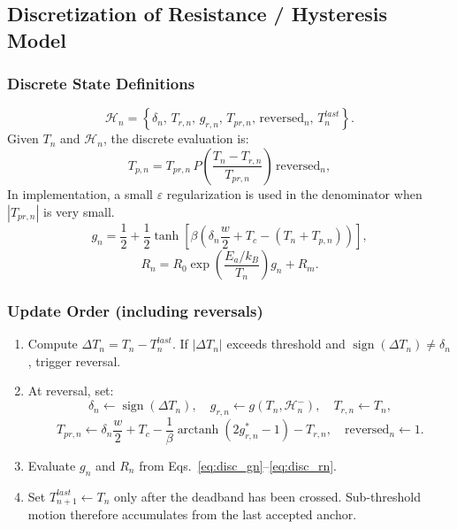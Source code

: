 \documentclass[11pt]{article}
\begin{document}
\subsection{Discretization of Resistance / Hysteresis Model}
\subsubsection*{Discrete State Definitions}
\begin{equation}
\mathcal{H}_n=
\left\{
\delta_n,\,
T_{r,n},\,
g_{r,n},\,
T_{pr,n},\,
\mathrm{reversed}_n,\,
T^{last}_n
\right\}.
\label{eq:disc_hysteresis_state}
\end{equation}
Given \(T_n\) and \(\mathcal{H}_n\), the discrete evaluation is:
\begin{equation}
T_{p,n}=T_{pr,n}\,
P\!\left(\frac{T_n-T_{r,n}}{T_{pr,n}}\right)\,
\mathrm{reversed}_n,
\label{eq:disc_tp}
\end{equation}
In implementation, a small \(\varepsilon\) regularization is used in the denominator when \(|T_{pr,n}|\) is very small.
\begin{equation}
g_n=
\frac{1}{2}
+\frac{1}{2}\tanh\!\left[
\beta\left(\delta_n\frac{w}{2}+T_c-(T_n+T_{p,n})\right)
\right],
\label{eq:disc_gn}
\end{equation}
\begin{equation}
R_n=
R_0\exp\!\left(\frac{E_a/k_B}{T_n}\right)g_n+R_m.
\label{eq:disc_rn}
\end{equation}

\subsubsection*{Update Order (including reversals)}
\begin{enumerate}
    \item Compute \(\Delta T_n=T_n-T^{last}_n\). If \(|\Delta T_n|\) exceeds threshold and \(\operatorname{sign}(\Delta T_n)\neq\delta_n\), trigger reversal.
    \item At reversal, set:
    \begin{equation}
    \delta_n\leftarrow \operatorname{sign}(\Delta T_n),\quad
    g_{r,n}\leftarrow g(T_n,\mathcal{H}_n^-),\quad
    T_{r,n}\leftarrow T_n,
    \label{eq:disc_reversal_assign}
    \end{equation}
    \begin{equation}
    T_{pr,n}\leftarrow
    \delta_n\frac{w}{2}+T_c-\frac{1}{\beta}\operatorname{arctanh}\!\left(2g^*_{r,n}-1\right)-T_{r,n},
    \quad
    \mathrm{reversed}_n\leftarrow 1.
    \label{eq:disc_reversal_tpr}
    \end{equation}
    \item Evaluate \(g_n\) and \(R_n\) from Eqs.~\eqref{eq:disc_gn}--\eqref{eq:disc_rn}.
    \item Set \(T^{last}_{n+1}\leftarrow T_n\) only after the deadband has been crossed. Sub-threshold motion therefore accumulates from the last accepted anchor.
\end{enumerate}
\end{document}

